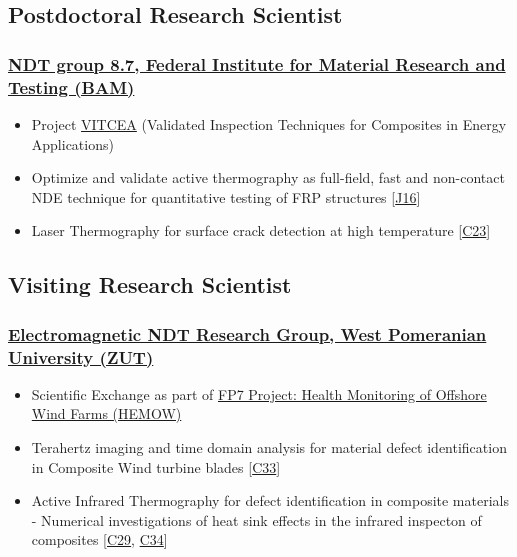 \documentclass{my_cv}%
\begin{document}
\subsection{Postdoctoral Research Scientist}
\subsubsection{\href{https://www.bam.de/Navigation/DE/Home/home.html}{NDT group 8.7, Federal Institute for Material Research and Testing (BAM)}}
\begin{itemize}[leftmargin=0.15in]
\setlength\itemsep{-0.1em}
\color{mygray}
\item Project \href{http://projects.npl.co.uk/vitcea/}{VITCEA} (Validated Inspection Techniques for Composites in Energy Applications) 
\item Optimize and validate active thermography as full-field, fast and non-contact NDE technique for quantitative testing of FRP structures [\textcolor{mypink}{\hyperref[J16]{J16}}]
\item Laser Thermography for surface crack detection at high temperature [\textcolor{mypink}{\hyperref[C23]{C23}}]
\end{itemize}
{\color{mygray1} \hdashrule[0.1ex]{18.8cm}{0.2mm}{1mm}}
\subsection{Visiting Research Scientist}
\subsubsection{\href{https://innowacje.zut.edu.pl/cooperationoffer/electromagnetic-methods-non-destructive-testing}{Electromagnetic NDT Research Group, West Pomeranian University (ZUT)}}
\begin{itemize}[leftmargin=0.15in]
\setlength\itemsep{-0.1em}
\color{mygray}
\item Scientific Exchange as part of \href{https://cordis.europa.eu/project/id/269202/results}{FP7 Project: Health Monitoring of Offshore Wind Farms (HEMOW)}
\item Terahertz imaging and time domain analysis for material defect identification in Composite Wind turbine blades [\textcolor{mypink}{\hyperref[C33]{C33}}]
\item Active Infrared Thermography for defect identification in composite materials - Numerical investigations of heat sink effects in the infrared inspecton of composites [\textcolor{mypink}{\hyperref[C29]{C29}}, \textcolor{mypink}{\hyperref[C34]{C34}}]
\end{itemize}
{\color{mygray1} \hdashrule[0.1ex]{18.8cm}{0.2mm}{1mm}}
\end{document}
